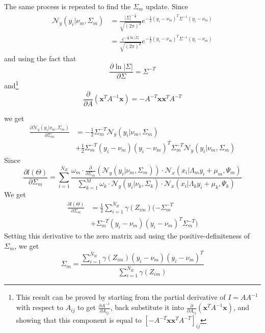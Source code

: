 The same process is repeated to find the $\Sigma_m$ update. Since
\begin{align}
\mathcal{N}_y\left(y_i\vert\nu_m,\Sigma_m\right) &= \frac{\vert\Sigma\vert^{-\frac{1}{2}}}{\sqrt{\left(2\pi\right)^d}}e^{-\frac{1}{2}\left(y_i - \nu_m\right)^T\Sigma^{-1}\left(y_i - \nu_m\right)}\\
&= \frac{e^{-\frac{1}{2}\ln\vert\Sigma\vert}}{\sqrt{\left(2\pi\right)^d}}e^{-\frac{1}{2}\left(y_i - \nu_m\right)^T\Sigma^{-1}\left(y_i - \nu_m\right)}
\end{align}
and using the fact that
\begin{equation}
\frac{\partial \ln\vert\Sigma\vert}{\partial \Sigma} = \Sigma^{-T}
\end{equation}
and\footnote{This result can be proved by starting from the partial derivative of $I = AA^{-1}$ with respect to $A_{ij}$ to get $\frac{\partial A^{-1}}{\partial A_{ij}}$, back substitute it into $\frac{\partial }{\partial A_{ij}}\left(\mathbf{x}^TA^{-1}\mathbf{x}\right)$, and showing that this component is equal to $\left[- A^{-T}\mathbf{x}\mathbf{x}^TA^{-T}\right]_{ij}$} 
\begin{equation}
\frac{\partial }{\partial A}\left(\mathbf{x}^TA^{-1}\mathbf{x}\right) = - A^{-T}\mathbf{x}\mathbf{x}^TA^{-T}
\end{equation}


we get
\begin{align}
\frac{\partial\mathcal{N}_y\left(y_i\vert\nu_m,\Sigma_m\right)}{\partial \Sigma_m} &= -\frac{1}{2}\Sigma_m^{-T}\mathcal{N}_y\left(y_i\vert\nu_m,\Sigma_m\right) \nonumber\\
&+ \frac{1}{2}
\Sigma_m^{-T}\left(y_i - \nu_m\right)\left(y_i - \nu_m\right)^T\Sigma_m^{-T}\mathcal{N}_y\left(y_i\vert\nu_m,\Sigma_m\right) 
\end{align}
Since
\begin{equation}
\frac{\partial l(\Theta)}{\partial \Sigma_m} =   \sum\limits_{i = 1}^{\bar{N}_R}
\frac{\omega_m\cdot
\frac{\partial }{\partial \Sigma_m}\left(\mathcal{N}_y\left(y_i\vert\nu_m,\Sigma_m\right)\right)\cdot\mathcal{N}_x\left(x_i\vert\Lambda_my_i + \mu_m,\Psi_m\right)}{\sum\limits_{k = 1}^{M}\omega_k\cdot
\mathcal{N}_y\left(y_i\vert\nu_k,\Sigma_k\right)\cdot\mathcal{N}_x\left(x_i\vert\Lambda_ky_i + \mu_k,\Psi_k\right) }
\end{equation}
We get
\begin{align}
\frac{\partial l(\Theta)}{\partial \Sigma_m} &=  \frac{1}{2} \sum\limits_{i = 1}^{\bar{N}_R}\gamma\left(Z_{im}\right)(-\Sigma_m^{-T}\nonumber\\
&+ 
\Sigma_m^{-T}\left(y_i - \nu_m\right)\left(y_i - \nu_m\right)^T\Sigma_m^{-T} )
\end{align}
Setting this derivative to the zero matrix and using the positive-definiteness of $\Sigma_m$, we get
\begin{equation}
\boxed{
\Sigma_m = \frac{  \sum\limits_{i = 1}^{\bar{N}_R} \gamma(Z_{im})\left(y_i - \nu_m\right)\left(y_i - \nu_m\right)^T }{  \sum\limits_{i = 1}^{\bar{N}_R}\gamma(Z_{im})}}
\end{equation}
